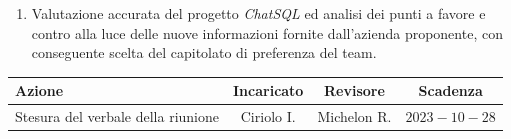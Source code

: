 \documentclass{article}
\begin{document}
\begin{paracol}{2}
\begin{enumerate}
\end{enumerate}

\vspace{7em}

\begin{enumerate}
    \item 
    Valutazione accurata del progetto \textit{ChatSQL} ed analisi dei punti a favore e contro alla luce delle nuove informazioni fornite dall’azienda proponente, con conseguente scelta del capitolato di preferenza del team.
\end{enumerate}

\end{paracol}

\vspace{3cm}


{\renewcommand{\arraystretch}{1.5}
\begin{tabularx}{\textwidth}{X|c|c|c}
\textbf{Azione} & \textbf{Incaricato} & \textbf{Revisore} & \textbf{Scadenza} \\
\hline
Stesura del verbale della riunione & Ciriolo I. & Michelon R. & $2023-10-28$ \\

\end{tabularx}}

\vspace{3em}
\end{document}
